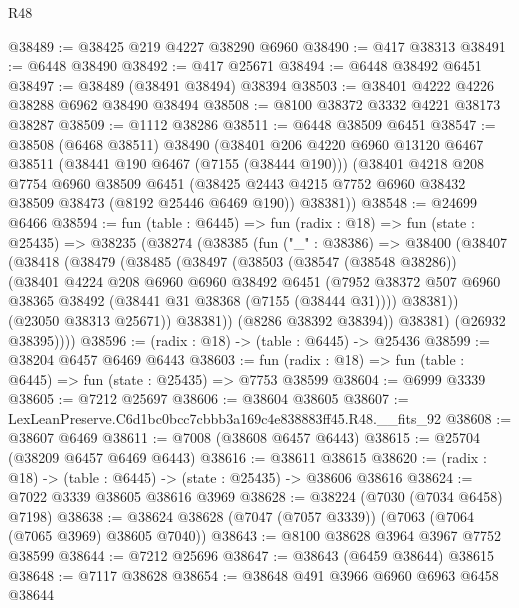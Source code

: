 \begin{lexlean}{R48}
\begin{coremodule}
@38489 := @38425 @219 @4227 @38290 @6960
@38490 := @417 @38313
@38491 := @6448 @38490
@38492 := @417 @25671
@38494 := @6448 @38492 @6451
@38497 := @38489 (@38491 @38494) @38394
@38503 := @38401 @4222 @4226 @38288 @6962 @38490 @38494
@38508 := @8100 @38372 @3332 @4221 @38173 @38287
@38509 := @1112 @38286
@38511 := @6448 @38509 @6451
@38547 := @38508
    (@6468 @38511)
    @38490
    (@38401
      @206
      @4220
      @6960
      @13120
      @6467
      @38511
      (@38441 @190 @6467 (@7155 (@38444 @190)))
      (@38401
        @4218
        @208
        @7754
        @6960
        @38509
        @6451
        (@38425 @2443 @4215 @7752 @6960 @38432 @38509 @38473 (@8192 @25446 @6469 @190))
        @38381))
@38548 := @24699 @6466
@38594 := fun (table : @6445) =>
  fun (radix : @18) =>
  fun (state : @25435) =>
  @38235
    (@38274
      (@38385
        (fun ("_" : @38386) =>
        @38400
          (@38407
            (@38418
              (@38479
                (@38485
                  (@38497
                    (@38503
                      (@38547 (@38548 @38286))
                      (@38401
                        @4224
                        @208
                        @6960
                        @6960
                        @38492
                        @6451
                        (@7952
                          @38372
                          @507
                          @6960
                          @38365
                          @38492
                          (@38441 @31 @38368 (@7155 (@38444 @31))))
                        @38381))
                    (@23050 @38313 @25671))
                  @38381))
              (@8286 @38392 @38394))
            @38381)
          (@26932 @38395))))
@38596 := (radix : @18) -> (table : @6445) -> @25436
@38599 := @38204 @6457 @6469 @6443
@38603 := fun (radix : @18) => fun (table : @6445) => fun (state : @25435) => @7753 @38599
@38604 := @6999 @3339
@38605 := @7212 @25697
@38606 := @38604 @38605
@38607 := LexLeanPreserve.C6d1bc0bcc7cbbb3a169c4e838883ff45.R48.__fits_92
@38608 := @38607 @6469
@38611 := @7008 (@38608 @6457 @6443)
@38615 := @25704 (@38209 @6457 @6469 @6443)
@38616 := @38611 @38615
@38620 := (radix : @18) -> (table : @6445) -> (state : @25435) -> @38606 @38616
@38624 := @7022 @3339 @38605 @38616 @3969
@38628 := @38224 (@7030 (@7034 @6458) @7198)
@38638 := @38624 @38628 (@7047 (@7057 @3339)) (@7063 (@7064 (@7065 @3969) @38605 @7040))
@38643 := @8100 @38628 @3964 @3967 @7752 @38599
@38644 := @7212 @25696
@38647 := @38643 (@6459 @38644) @38615
@38648 := @7117 @38628
@38654 := @38648 @491 @3966 @6960 @6963 @6458 @38644

\end{coremodule}
\end{lexlean}
